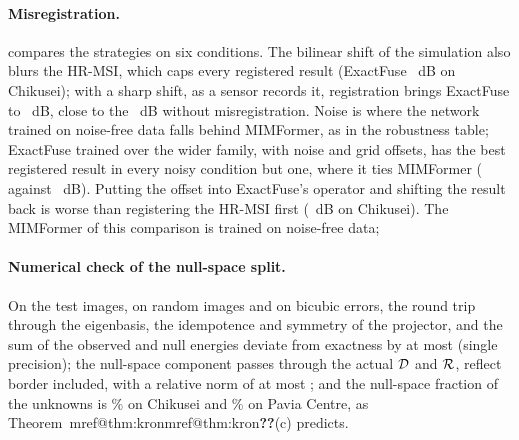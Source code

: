 \documentclass[10pt,twocolumn,letterpaper]{article}
\makeatletter
\newcommand{\mref}[1]{\ifcsname mref@#1\endcsname\csname mref@#1\endcsname\else\textbf{??}\fi}
\makeatother
\begin{document}
\paragraph{Misregistration.}  compares the strategies on six conditions. The bilinear shift of the simulation also blurs the HR-MSI, which caps every registered result (ExactFuse ~dB on Chikusei); with a sharp shift, as a sensor records it, registration brings ExactFuse to ~dB, close to the ~dB without misregistration. Noise is where the network trained on noise-free data falls behind MIMFormer, as in the robustness table; ExactFuse trained over the wider family, with noise and grid offsets, has the best registered result in every noisy condition but one, where it ties MIMFormer ( against ~dB). Putting the offset into ExactFuse's operator and shifting the result back is worse than registering the HR-MSI first (~dB on Chikusei). The MIMFormer of this comparison is trained on noise-free data; 

\paragraph{Numerical check of the null-space split.} On the test images, on random images and on bicubic errors, the round trip through the eigenbasis, the idempotence and symmetry of the projector, and the sum of the observed and null energies deviate from exactness by at most  (single precision); the null-space component passes through the actual $\mathcal{D}$ and $\mathcal{R}$, reflect border included, with a relative norm of at most ; and the null-space fraction of the unknowns is \% on Chikusei and \% on Pavia Centre, as Theorem~\mref{thm:kron}(c) predicts.
\end{document}

